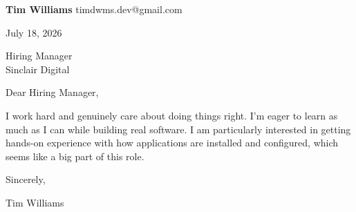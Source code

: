 \documentclass[12pt]{article}
\begin{document}
\textbf{Tim Williams} \hfill timdwms.dev@gmail.com

\vspace{1em}

July 18, 2026

\vspace{1em}

Hiring Manager \\
Sinclair Digital

\vspace{1em}

Dear Hiring Manager,

I work hard and genuinely care about doing things right. I'm eager to learn as much as I can while building real software. I am particularly interested in getting hands-on experience with how applications are installed and configured, which seems like a big part of this role.

\vspace{1em}

Sincerely,

\vspace{2em}

Tim Williams
\end{document}

